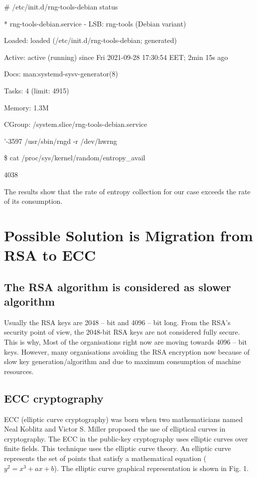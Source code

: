 \documentclass[runningheads]{llncs}
\begin{document}
\# /etc/init.d/rng-tools-debian status

* rng-tools-debian.service - LSB: rng-tools (Debian variant)

Loaded: loaded (/etc/init.d/rng-tools-debian; generated)

Active: active (running) since Fri 2021-09-28 17:30:54 EET; 2min 15s ago

Docs: man:systemd-sysv-generator(8)

Tasks: 4 (limit: 4915)

Memory: 1.3M

CGroup: /system.slice/rng-tools-debian.service

'-3597 /usr/sbin/rngd -r /dev/hwrng

\$ cat /proc/sys/kernel/random/entropy\_avail

4038

The results show that the rate of entropy collection for our case exceeds the rate of its consumption.

\section{Possible Solution is Migration from RSA to ECC}
\label{sec:6}

\subsection{The RSA algorithm is considered as slower algorithm}
\label{sub-sec:6-1}

Usually the RSA keys are 2048 – bit and 4096 – bit long. From the RSA's security point of view, the 2048-bit RSA keys are not considered fully secure. This is why, Most of the organisations right now are moving towards 4096 – bit keys. However, many organisations avoiding the RSA encryption now because of slow key generation/algorithm and due to maximum consumption of machine resources.

\subsection{ECC cryptography}
\label{sub-sec:6-2}


ECC (elliptic curve cryptography) was born when two mathematicians named Neal Koblitz and Victor S. Miller proposed the use of elliptical curves in cryptography. The ECC in the public-key cryptography uses elliptic curves over finite fields. This technique uses the elliptic curve theory. An elliptic curve represents the set of points that satisfy a mathematical equation ($y^2 = x^3 + ax + b$). The elliptic curve graphical representation is shown in Fig. 1.
\end{document}
